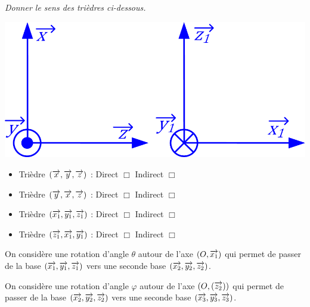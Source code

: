 \documentclass[10pt]{article}
\begin{document}
\subparagraph{} \textit{Donner le sens des trièdres ci-dessous.}

\begin{minipage}[c]{.4\linewidth}
\begin{center}
\includegraphics[width=.95\textwidth]{images/fig_01}
\end{center}
\end{minipage}\hfill
\begin{minipage}[c]{.48\linewidth}
\begin{itemize}
\item Trièdre $\left(\overrightarrow{x},\overrightarrow{y},\overrightarrow{z}\right)$ : \hspace{1cm} Direct $\Box$ \hspace{1cm} Indirect $\Box$
\item Trièdre $\left(\overrightarrow{y},\overrightarrow{x},\overrightarrow{z}\right)$ : \hspace{1cm} Direct $\Box$ \hspace{1cm} Indirect $\Box$
\item Trièdre $\left(\overrightarrow{x_1},\overrightarrow{y_1},\overrightarrow{z_1}\right)$ : \hspace{1cm} Direct $\Box$ \hspace{1cm} Indirect $\Box$
\item Trièdre $\left(\overrightarrow{z_1},\overrightarrow{x_1},\overrightarrow{y_1}\right)$ : \hspace{1cm} Direct $\Box$ \hspace{1cm} Indirect $\Box$
\end{itemize}
\end{minipage}

\vspace{1cm}
On considère une rotation d'angle $\theta$ autour de l'axe $(O,\overrightarrow{x_1})$ qui permet de passer de la base $\left(\overrightarrow{x_1},\overrightarrow{y_1}, \overrightarrow{z_1}\right)$ vers une seconde base $\left(\overrightarrow{x_2},\overrightarrow{y_2}, \overrightarrow{z_2}\right)$.

On considère une rotation d’angle $\varphi$ autour de l’axe $(O,(\overrightarrow{z_2}))$ qui permet de passer de la base $\left(\overrightarrow{x_2},\overrightarrow{y_2}, \overrightarrow{z_2}\right)$ vers une seconde base $\left(\overrightarrow{x_3},\overrightarrow{y_3}, \overrightarrow{z_3}\right)$.
\end{document}
